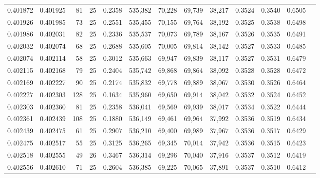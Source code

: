 \begin{tabular}{rrrrrrrrrrrrr}
0.401872 & 0.401925 &    81 &  25 &                                     0.2358 & 535,382 &  70,228 &  69,739 &  38,217 & 0.3524 & 0.3540 & 0.6505 \\
0.401926 & 0.401985 &    73 &  25 &                                     0.2551 & 535,455 &  70,155 &  69,764 &  38,192 & 0.3525 & 0.3538 & 0.6498 \\
0.401986 & 0.402031 &    82 &  25 &                                     0.2336 & 535,537 &  70,073 &  69,789 &  38,167 & 0.3526 & 0.3535 & 0.6491 \\
0.402032 & 0.402074 &    68 &  25 &                                     0.2688 & 535,605 &  70,005 &  69,814 &  38,142 & 0.3527 & 0.3533 & 0.6485 \\
0.402074 & 0.402114 &    58 &  25 &                                     0.3012 & 535,663 &  69,947 &  69,839 &  38,117 & 0.3527 & 0.3531 & 0.6479 \\
0.402115 & 0.402168 &    79 &  25 &                                     0.2404 & 535,742 &  69,868 &  69,864 &  38,092 & 0.3528 & 0.3528 & 0.6472 \\
0.402169 & 0.402227 &    90 &  25 &                                     0.2174 & 535,832 &  69,778 &  69,889 &  38,067 & 0.3530 & 0.3526 & 0.6464 \\
0.402227 & 0.402303 &   128 &  25 &                                     0.1634 & 535,960 &  69,650 &  69,914 &  38,042 & 0.3532 & 0.3524 & 0.6452 \\
0.402303 & 0.402360 &    81 &  25 &                                     0.2358 & 536,041 &  69,569 &  69,939 &  38,017 & 0.3534 & 0.3522 & 0.6444 \\
0.402361 & 0.402439 &   108 &  25 &                                     0.1880 & 536,149 &  69,461 &  69,964 &  37,992 & 0.3536 & 0.3519 & 0.6434 \\
0.402439 & 0.402475 &    61 &  25 &                                     0.2907 & 536,210 &  69,400 &  69,989 &  37,967 & 0.3536 & 0.3517 & 0.6429 \\
0.402475 & 0.402517 &    55 &  25 &                                     0.3125 & 536,265 &  69,345 &  70,014 &  37,942 & 0.3536 & 0.3515 & 0.6423 \\
0.402518 & 0.402555 &    49 &  26 &                                     0.3467 & 536,314 &  69,296 &  70,040 &  37,916 & 0.3537 & 0.3512 & 0.6419 \\
0.402556 & 0.402610 &    71 &  25 &                                     0.2604 & 536,385 &  69,225 &  70,065 &  37,891 & 0.3537 & 0.3510 & 0.6412 \\

\end{tabular}
